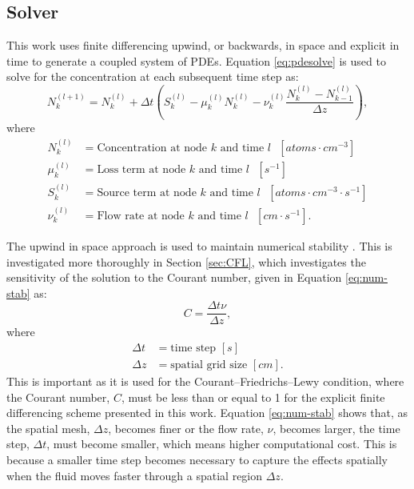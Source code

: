 \documentclass{style/nseJournal}
\begin{document}
\subsection{Solver}

This work uses finite differencing upwind, or backwards, in space and explicit in time to generate a coupled system of PDEs.
Equation \eqref{eq:pdesolve} is used to solve for the concentration at each subsequent time step as:
\begin{equation}
    N_k^{(l+1)} = N_k^{(l)} 
+ \Delta t \left( 
S_k^{(l)} 
- \mu_k^{(l)} N_k^{(l)} 
- \nu_k^{(l)}  \frac{ N_k^{(l)} - N_{k-1}^{(l)} }{\Delta z}
\right),
    \label{eq:pdesolve}
\end{equation}
where
\begin{align}
    N_{k}^{(l)} &= \text{Concentration at node $k$ and time $l$ $[atoms \cdot cm^{-3}]$} \nonumber \\
    \mu_{k}^{(l)} &= \text{Loss term at node $k$ and time $l$ $[s^{-1}]$} \nonumber \\
    S_{k}^{(l)} &= \text{Source term at node $k$ and time $l$ $[atoms \cdot cm^{-3} \cdot s^{-1}]$} \nonumber \\
    \nu_{k}^{(l)} &= \text{Flow rate at node $k$ and time $l$ $[cm \cdot s^{-1}]$}.
\end{align}

The upwind in space approach is used to maintain numerical stability \cite{advecbook}.
This is investigated more thoroughly in Section \ref{sec:CFL}, which investigates the sensitivity of the solution to the Courant number, given in Equation \eqref{eq:num-stab} as:
\begin{equation}
    C = \frac{\Delta t \nu}{\Delta z},
\label{eq:num-stab}
\end{equation}
where
\begin{align}
    \Delta t &= \text{time step $[s]$} \nonumber \\
    \Delta z &= \text{spatial grid size $[cm]$}. 
\end{align}
This is important as it is used for the Courant–Friedrichs–Lewy condition, where the Courant number, $C$, must be less than or equal to 1 for the explicit finite differencing scheme presented in this work.
Equation \eqref{eq:num-stab} shows that, as the spatial mesh, $\Delta z$, becomes finer or the flow rate, $\nu$, becomes larger, the time step, $\Delta t$, must become smaller, which means higher computational cost.
This is because a smaller time step becomes necessary to capture the effects spatially when the fluid moves faster through a spatial region $\Delta z$.
\end{document}
